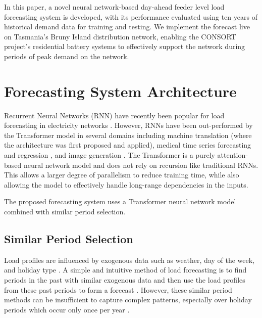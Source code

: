 \documentclass[conference]{IEEEtran}
\begin{document}
In this paper, a novel neural network-based day-ahead feeder level load forecasting system is developed, with its performance evaluated using ten years of historical demand data for training and testing. We implement the forecast live on Tasmania's Bruny Island distribution network, enabling the CONSORT project's residential battery systems to effectively support the network during periods of peak demand on the network.

\section{Forecasting System Architecture}

Recurrent Neural Networks (RNN) have recently been popular for load forecasting in electricity networks \cite{Kong2018}.
However, RNNs have been out-performed by the Transformer \cite{Vaswani2017} model in several domains including machine translation \cite{Vaswani2017} (where the architecture was first proposed and applied), medical time series forecasting and regression \cite{Song2017}, and image generation \cite{Parmar2018}.
The Transformer is a purely attention-based neural network model and does not rely on recursion like traditional RNNs.
This allows a larger degree of parallelism to reduce training time, while also allowing the model to effectively handle long-range dependencies in the inputs.

The proposed forecasting system uses a Transformer neural network model combined with similar period selection.


\subsection{Similar Period Selection} \label{simperiod}
Load profiles are influenced by exogenous data such as weather, day of the week, and holiday type \cite{Weron2006}.
A simple and intuitive method of load forecasting is to find periods in the past with similar exogenous data and then use the load profiles from these past periods to form a forecast \cite{Senjyu1998}.
However, these similar period methods can be insufficient to capture complex patterns, especially over holiday periods which occur only once per year \cite{Chen2010}.

\end{document}
